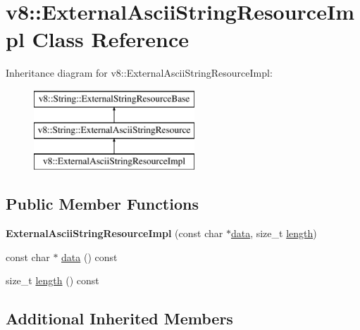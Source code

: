 \hypertarget{classv8_1_1_external_ascii_string_resource_impl}{}\section{v8\+:\+:External\+Ascii\+String\+Resource\+Impl Class Reference}
\label{classv8_1_1_external_ascii_string_resource_impl}
Inheritance diagram for v8\+:\+:External\+Ascii\+String\+Resource\+Impl\+:\begin{figure}[H]
\begin{center}
\leavevmode
\includegraphics[height=3.000000cm]{classv8_1_1_external_ascii_string_resource_impl}
\end{center}
\end{figure}
\subsection*{Public Member Functions}
\begin{DoxyCompactItemize}
\item 
\hypertarget{classv8_1_1_external_ascii_string_resource_impl_ad43442534df30aebaf0125ba12aef925}{}{\bfseries External\+Ascii\+String\+Resource\+Impl} (const char $\ast$\hyperlink{classv8_1_1_external_ascii_string_resource_impl_a39719832d6d06fbfd8a86cf1cd6f9d6f}{data}, size\+\_\+t \hyperlink{classv8_1_1_external_ascii_string_resource_impl_a8f37b80039c1ef29b0c755354a11424a}{length})\label{classv8_1_1_external_ascii_string_resource_impl_ad43442534df30aebaf0125ba12aef925}

\item 
const char $\ast$ \hyperlink{classv8_1_1_external_ascii_string_resource_impl_a39719832d6d06fbfd8a86cf1cd6f9d6f}{data} () const 
\item 
size\+\_\+t \hyperlink{classv8_1_1_external_ascii_string_resource_impl_a8f37b80039c1ef29b0c755354a11424a}{length} () const 
\end{DoxyCompactItemize}
\subsection*{Additional Inherited Members}


